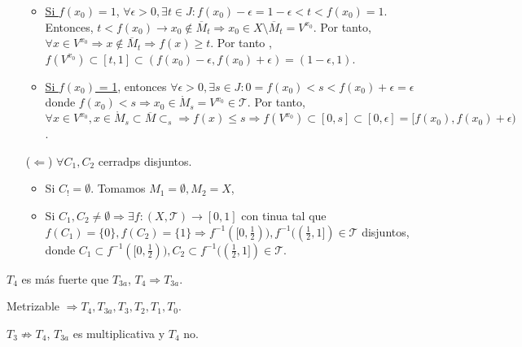\begin{dem}
\begin{enumerate}[label=(\roman*)]
\begin{itemize}
    \item \underline{ Si $f(x_{0}) = 1$}, $ \forall \epsilon >0, \exists t \in J :  f(x_{0}) - \epsilon = 1- \epsilon < t < f(x_{0}) = 1$. Entonces, $t < f(x_{0}) \rightarrow x_{0} \not \in \overline{M}_{t} \Rightarrow x_{0} \in X \setminus \overline{M}_{t} = V^{x_{0}}$. Por tanto, $\forall x \in V^{x_{0}} \Rightarrow x \not \in \overline{M}_{t} \Rightarrow f(x) \geq t$. Por tanto , $f(V^{x_{0}}) \subset [t, 1] \subset (f(x_{0}) - \epsilon, f(x_{0}) + \epsilon) = (1- \epsilon, 1)$.
    \item \underline{ Si $f(x_{0})$ = 1}, entonces $\forall \epsilon > 0, \exists s \in J: 0 = f(x_{0}) < s < f(x_{0}) + \epsilon = \epsilon$ donde $f(x_{0}) < s \Rightarrow x_{0} \in \mathring{M}_{s} = V^{x_{0}} \in \mathcal{T}$. Por tanto, $\forall x \in V^{x_{0}}, x \in \mathring{M}_{s} \subset \overline{M} \subset_{s} \Rightarrow f(x) \leq s \Rightarrow f(V^{x_{0}}) \subset [0, s] \subset [0, \epsilon] = [f(x_{0}), f(x_{0})+ \epsilon)$.
      \end{itemize}

    \item [($\Leftarrow$)] $\forall C_{1}, C_{2}$ cerradps disjuntos.
      \begin{itemize}
        \item Si $C_! = \emptyset$. Tomamos $ M_{1} = \emptyset, M_{2} = X$,
        \item Si $C_{1}, C_{2} \neq \emptyset \Rightarrow \exists f: ( X, \mathcal{T} ) \to [0,1]$ con tinua tal que $f(C_{1}) = \{  0 \}, f(C_{2}) = \{ 1 \} \Rightarrow f^{-1}([0, \frac{1}{2})), f^{-1}((\frac{1}{2},1]) \in \mathcal{T}$ disjuntos, donde $C_{1} \subset f^{-1}([0, \frac{1}{2})),  C_{2} \subset f^{-1}((\frac{1}{2},1]) \in \mathcal{T}$.
      \end{itemize}
  \end{enumerate}
\end{dem}

\begin{cor}
  $T_{4}$ es más fuerte que $T_{3a}$, $T_{4} \Rightarrow T_{3a}$.
\end{cor}

\begin{obs}
  Metrizable $\Rightarrow T_{4}, T_{3a}, T_{3}, T_{2}, T_{1}, T_{0}$.
\end{obs}

\begin{obs}
  $T_{3} \not \Rightarrow T_{4}$, $T_{3a}$ es multiplicativa y $T_{4}$ no.
\end{obs}
